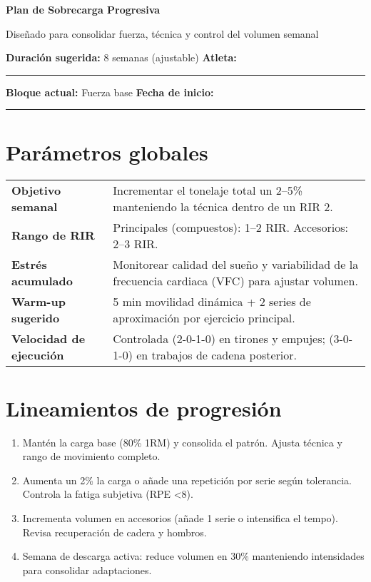 \documentclass[12pt]{article}
\begin{document}
{\Huge\bfseries\color{primary} Plan de Sobrecarga Progresiva}\par
{\large\color{textgray}Diseñado para consolidar fuerza, técnica y control del volumen semanal}

\vspace{1em}
\textbf{Duración sugerida:} 8 semanas (ajustable) \hfill \textbf{Atleta:} \rule{4cm}{0.4pt}

\vspace{0.5em}
\textbf{Bloque actual:} Fuerza base \hfill \textbf{Fecha de inicio:} \rule{3cm}{0.4pt}

\section*{Parámetros globales}
\begin{tabularx}{\linewidth}{>{\bfseries\color{primary}}lY}
Objetivo semanal & Incrementar el tonelaje total un 2--5\% manteniendo la técnica dentro de un RIR 2. \\
Rango de RIR & Principales (compuestos): 1--2 RIR. Accesorios: 2--3 RIR. \\
Estrés acumulado & Monitorear calidad del sueño y variabilidad de la frecuencia cardiaca (VFC) para ajustar volumen. \\
Warm-up sugerido & 5 min movilidad dinámica + 2 series de aproximación por ejercicio principal. \\
Velocidad de ejecución & Controlada (2-0-1-0) en tirones y empujes; (3-0-1-0) en trabajos de cadena posterior. \\
\end{tabularx}

\vspace{1em}
\section*{Lineamientos de progresión}
\begin{enumerate}[label=\textbf{Semana \arabic*:}, leftmargin=1.5cm]
  \item Mantén la carga base (80\% 1RM) y consolida el patrón. Ajusta técnica y rango de movimiento completo.
  \item Aumenta un 2\% la carga o añade una repetición por serie según tolerancia. Controla la fatiga subjetiva (RPE \textless{}8).
  \item Incrementa volumen en accesorios (añade 1 serie o intensifica el tempo). Revisa recuperación de cadera y hombros.
  \item Semana de descarga activa: reduce volumen en 30\% manteniendo intensidades para consolidar adaptaciones.
\end{enumerate}
\end{document}
